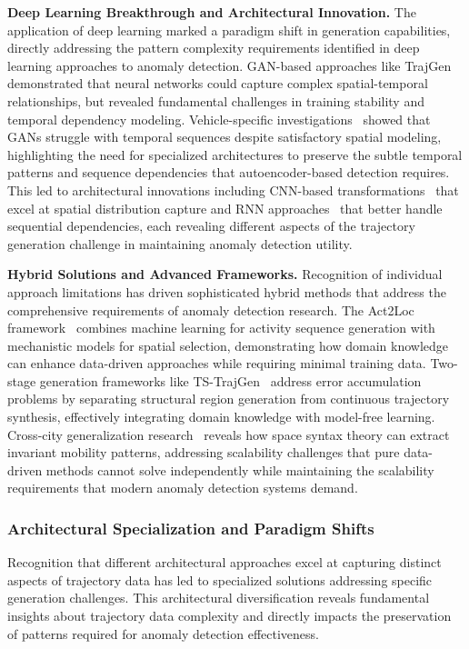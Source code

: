 \documentclass[runningheads]{llncs}
\begin{document}
\textbf{Deep Learning Breakthrough and Architectural Innovation.} The application of deep learning marked a paradigm shift in generation capabilities, directly addressing the pattern complexity requirements identified in deep learning approaches to anomaly detection. GAN-based approaches like TrajGen~\cite{cao2021generating} demonstrated that neural networks could capture complex spatial-temporal relationships, but revealed fundamental challenges in training stability and temporal dependency modeling. Vehicle-specific investigations~\cite{bajarunas2022generative} showed that GANs struggle with temporal sequences despite satisfactory spatial modeling, highlighting the need for specialized architectures to preserve the subtle temporal patterns and sequence dependencies that autoencoder-based detection requires. This led to architectural innovations including CNN-based transformations~\cite{merhi2024synthetic} that excel at spatial distribution capture and RNN approaches~\cite{du2016recurrent} that better handle sequential dependencies, each revealing different aspects of the trajectory generation challenge in maintaining anomaly detection utility.

\textbf{Hybrid Solutions and Advanced Frameworks.} Recognition of individual approach limitations has driven sophisticated hybrid methods that address the comprehensive requirements of anomaly detection research. The Act2Loc framework~\cite{liu2023act2loc} combines machine learning for activity sequence generation with mechanistic models for spatial selection, demonstrating how domain knowledge can enhance data-driven approaches while requiring minimal training data. Two-stage generation frameworks like TS-TrajGen~\cite{jiang2023continuous} address error accumulation problems by separating structural region generation from continuous trajectory synthesis, effectively integrating domain knowledge with model-free learning. Cross-city generalization research~\cite{wang2025gtg} reveals how space syntax theory can extract invariant mobility patterns, addressing scalability challenges that pure data-driven methods cannot solve independently while maintaining the scalability requirements that modern anomaly detection systems demand.

\subsubsection{Architectural Specialization and Paradigm Shifts}

Recognition that different architectural approaches excel at capturing distinct aspects of trajectory data has led to specialized solutions addressing specific generation challenges. This architectural diversification reveals fundamental insights about trajectory data complexity and directly impacts the preservation of patterns required for anomaly detection effectiveness.
\end{document}
